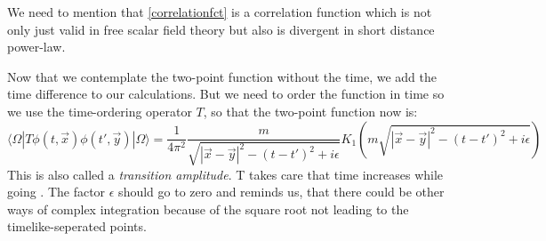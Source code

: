 	We need to mention that \eqref{correlationfct} is a correlation function which is not only just valid in free scalar field theory but also is divergent in short distance power-law. 
	
	Now that we contemplate the two-point function without the time, we add the time difference to our calculations. But we need to order the function in time so we use the time-ordering operator $T$, so that the two-point function now is:
		\begin{equation}
			\langle \Omega| T \phi(t,\vec{x})\phi(t',\vec{y}) |\Omega\rangle=
			\frac{1}{4\pi^2} \frac{m}{\sqrt{|\vec{x}-\vec{y}|^2-(t-t')^2+i\epsilon}}
			K_1 \left( m\sqrt{|\vec{x}-\vec{y}|^2-(t-t')^2+i\epsilon}\right)
		\end{equation} 
	This is also called a \textit{transition amplitude}. T takes care that time increases while going . The factor $\epsilon$ should go to zero and reminds us, that there could be other ways of complex integration because of the square root not leading to the timelike-seperated points.